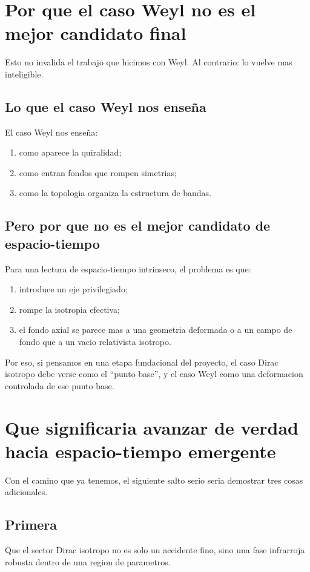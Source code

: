 \section{Por que el caso Weyl no es el mejor candidato final}
Esto no invalida el trabajo que hicimos con Weyl. Al contrario: lo vuelve mas inteligible.

\subsection{Lo que el caso Weyl nos ense\~na}
El caso Weyl nos ense\~na:
\begin{enumerate}[label=\arabic*.]
    \item como aparece la quiralidad;
    \item como entran fondos que rompen simetrias;
    \item como la topologia organiza la estructura de bandas.
\end{enumerate}

\subsection{Pero por que no es el mejor candidato de espacio-tiempo}
Para una lectura de espacio-tiempo intrinseco, el problema es que:
\begin{enumerate}[label=\arabic*.]
    \item introduce un eje privilegiado;
    \item rompe la isotropia efectiva;
    \item el fondo axial se parece mas a una geometria deformada o a un campo de fondo que a un vacio relativista isotropo.
\end{enumerate}

Por eso, si pensamos en una etapa fundacional del proyecto, el caso Dirac isotropo debe verse como el \enquote{punto base}, y el caso Weyl como una deformacion controlada de ese punto base.

\section{Que significaria avanzar de verdad hacia espacio-tiempo emergente}
Con el camino que ya tenemos, el siguiente salto serio seria demostrar tres cosas adicionales.

\subsection{Primera}
Que el sector Dirac isotropo no es solo un accidente fino, sino una fase infrarroja robusta dentro de una region de parametros.

